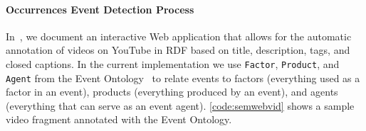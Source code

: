 \documentclass[runningheads,a4paper]{llncs}
\begin{document}

\paragraph{Occurrences Event Detection Process}
In~\cite{semwebvid}, we document an interactive Web application that allows for the automatic annotation of videos on YouTube in RDF based on title, description, tags, and closed captions. In the current implementation we use \texttt{Factor}, \texttt{Product}, and \texttt{Agent} from the Event Ontology~\cite{Raimond:Event} to relate events to factors (everything used as a factor in an event), products (everything produced by an event), and agents (everything that can serve as an event agent). \autoref{code:semwebvid} shows a sample video fragment annotated with the Event Ontology.
\end{document}
